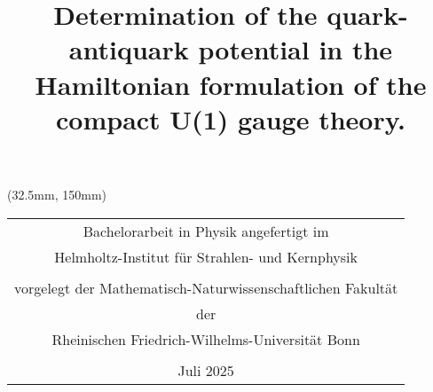 \documentclass[sn-mathphys-num,iicol]{sn-jnl}
\theoremstyle{thmstyleone}
\theoremstyle{thmstyletwo}
\theoremstyle{thmstylethree}
\begin{document}
\title[]{Determination of the quark-antiquark potential in the Hamiltonian formulation of the compact U(1) gauge theory.}
\author{ }

\maketitle
\begingroup
\renewcommand{\arraystretch}{1.8}
\begin{textblock*}{140mm}(32.5mm, 150mm)
	\begin{center}
		\begin{tabular}{c}
			\large{Bachelorarbeit in Physik angefertigt im}                     \\
			\large{Helmholtz-Institut für Strahlen- und Kernphysik}             \\
			\\
			\large{vorgelegt der Mathematisch-Naturwissenschaftlichen Fakultät} \\
			\large{der}                                                         \\
			\large{Rheinischen Friedrich-Wilhelms-Universität Bonn}             \\
			\\
			\large{Juli 2025}
		\end{tabular}
	\end{center}
\end{textblock*}
\endgroup

\clearpage
{}

\clearpage










\,\clearpage

\end{document}
